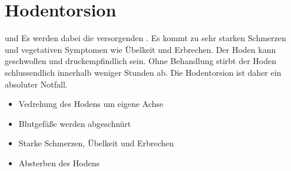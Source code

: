 \section{Hodentorsion}

\TextSlide
{{\TxBeschreibung} und \TxSymptome}%
{%
%
Es werden dabei die
versorgenden . 
% 
Es kommt zu sehr starken Schmerzen und vegetativen Symptomen wie Übelkeit und Erbrechen.
%
Der Hoden kann geschwollen und druckempfindlich sein.
%
Ohne Behandlung stirbt der Hoden schlussendlich innerhalb weniger Stunden ab. 
%
Die Hodentorsion ist daher ein absoluter Notfall. 
}%
{%
\begin{itemize}
  \item Vedrehung des Hodens um eigene Achse
  \item Blutgefäße werden abgeschnürt
  \item Starke Schmerzen, Übelkeit und Erbrechen
  \item Absterben des Hodens
\end{itemize}
}%
 






\ChapterEnd